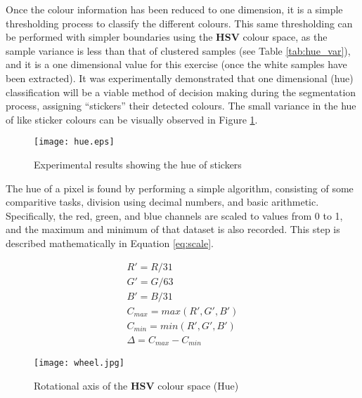 \documentclass[11pt, a4paper, oneside]{Thesis} %
\begin{document}
Once the colour information has been reduced to one dimension, it is a simple thresholding process to classify the different colours. This same thresholding can be performed with simpler boundaries using the \textbf{HSV} colour space, as the sample variance is less than that of clustered samples (see Table \ref{tab:hue_var}), and it is a one dimensional value for this exercise (once the white samples have been extracted). It was experimentally demonstrated that one dimensional (hue) classification will be a viable method of decision making during the segmentation process, assigning ``stickers'' their detected colours. The small variance in the hue of like sticker colours can be visually observed in Figure \ref{fig:huetest}.\\

\begin{figure}[h]
  \begin{center}
    \texttt{[image: hue.eps]}
  \end{center}
  \caption{Experimental results showing the hue of stickers}
  \label{fig:huetest}
\end{figure}

The hue of a pixel is found by performing a simple algorithm, consisting of some comparitive tasks, division using decimal numbers, and basic arithmetic. Specifically, the red, green, and blue channels are scaled to values from 0 to 1, and the maximum and minimum of that dataset is also recorded. This step is described mathematically in Equation \ref{eq:scale}.

\begin{equation}\label{eq:scale}
\begin{split}
R' = R/31\\
G' = G/63\\
B' = B/31\\
C_{max} = max(R',G',B')\\
C_{min} = min(R',G',B')\\
\Delta = C_{max} - C_{min}
\end{split}
\end{equation}

\begin{figure}[h]
  \begin{center}
    \texttt{[image: wheel.jpg]}
  \end{center}
  \caption{Rotational axis of the \textbf{HSV} colour space (Hue)}
  \label{fig:wheel}
\end{figure}
\end{document}
